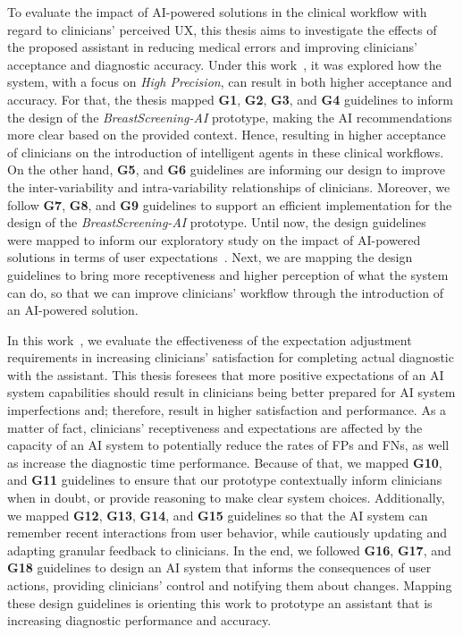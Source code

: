 

To evaluate the impact of \ac{AI}-powered solutions in the clinical workflow with regard to clinicians' perceived \ac{UX}, this thesis aims to investigate the effects of the proposed assistant in reducing medical errors and improving clinicians' acceptance and diagnostic accuracy.
Under this work~\cite{CALISTO2022102285}, it was explored how the system, with a focus on {\it High Precision}, can result in both higher acceptance and accuracy.
For that, the thesis mapped {\bf G1}, {\bf G2}, {\bf G3}, and {\bf G4} guidelines to inform the design of the {\it BreastScreening-AI} prototype, making the \ac{AI} recommendations more clear based on the provided context.
Hence, resulting in higher acceptance of clinicians on the introduction of intelligent agents in these clinical workflows.
On the other hand, {\bf G5}, and {\bf G6} guidelines are informing our design to improve the inter-variability and intra-variability relationships of clinicians.
Moreover, we follow {\bf G7}, {\bf G8}, and {\bf G9} guidelines to support an efficient implementation for the design of the {\it BreastScreening-AI} prototype.
Until now, the design guidelines~\cite{10.1145/3290605.3300233} were mapped to inform our exploratory study on the impact of  \ac{AI}-powered solutions in terms of user expectations~\cite{Kocielnik:2019:YAI:3290605.3300641}.
Next, we are mapping the design guidelines to bring more receptiveness and higher perception of what the system can do, so that we can improve clinicians' workflow through the introduction of an \ac{AI}-powered solution.

In this work~\cite{CALISTO2022102285}, we evaluate the effectiveness of the expectation adjustment requirements in increasing clinicians' satisfaction for completing actual diagnostic with the assistant.
This thesis foresees that more positive expectations of an \ac{AI} system capabilities should result in clinicians being better prepared for \ac{AI} system imperfections and; therefore, result in higher satisfaction and performance.
As a matter of fact, clinicians' receptiveness and expectations are affected by the capacity of an \ac{AI} system to potentially reduce the rates of \acp{FP} and \acp{FN}, as well as increase the diagnostic time performance.
Because of that, we mapped {\bf G10}, and {\bf G11} guidelines to ensure that our prototype contextually inform clinicians when in doubt, or provide reasoning to make clear system choices.
Additionally, we mapped {\bf G12}, {\bf G13}, {\bf G14}, and {\bf G15} guidelines so that the \ac{AI} system can remember recent interactions from user behavior, while cautiously updating and adapting granular feedback to clinicians.
In the end, we followed {\bf G16}, {\bf G17}, and {\bf G18} guidelines to design an \ac{AI} system that informs the consequences of user actions, providing clinicians' control and notifying them about changes.
Mapping these design guidelines is orienting this work to prototype an assistant that is increasing diagnostic performance and accuracy.

